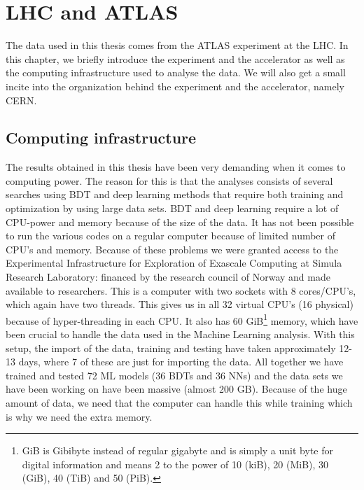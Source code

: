 \chapter{LHC and ATLAS}
\label{sec:LHCandATLAS}
The data used in this thesis comes from the ATLAS experiment at the LHC. In this chapter, we briefly introduce the experiment and the accelerator as well as the computing infrastructure used to analyse the data. We will also get a small incite into the organization behind the experiment and the accelerator, namely CERN. 









\section{Computing infrastructure}
The results obtained in this thesis have been very demanding when it comes to computing power. The reason for this is that the analyses consists of several searches using BDT and deep learning methods that require both training and optimization by using large data sets. BDT and deep learning require a lot of CPU-power and memory because of the size of the data. It has not been possible to run the various codes on a regular computer because of limited number of CPU's and memory. Because of these problems we were granted access to the Experimental Infrastructure for Exploration of Exascale Computing at Simula Research Laboratory: financed by the research council of Norway and made available to researchers. This is a computer with two sockets with 8 cores/CPU's, which again have two threads. This gives us in all 32 virtual CPU's (16 physical) because of hyper-threading in each CPU. It also has 60 GiB\footnote{GiB is Gibibyte instead of regular gigabyte and is simply a unit byte for digital information and means 2 to the power of 10 (kiB), 20 (MiB), 30 (GiB), 40 (TiB) and 50 (PiB).} memory, which have been crucial to handle the data used in the Machine Learning analysis. With this setup, the import of the data, training and testing have taken approximately 12-13 days, where 7 of these are just for importing the data. All together we have trained and tested 72 ML models (36 BDTs and 36 NNs) and the data sets we have been working on have been massive (almost 200 GB). Because of the huge amount of data, we need that the computer can handle this while training which is why we need the extra memory.

